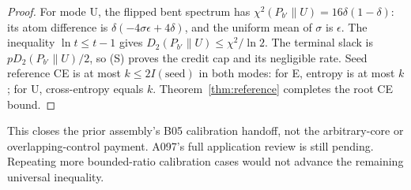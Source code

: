 \documentclass[11pt]{article}
\newcommand{\KL}{D_2}
\begin{document}
\begin{proof}
For mode U, the flipped bent spectrum has
$\chi^2(P_{b'}\|U)=16\delta(1-\delta)$:
its atom difference is $\delta(-4\sigma\epsilon+4\delta)$,
and the uniform mean of $\sigma$ is $\epsilon$.
The inequality $\ln t\le t-1$ gives
$\KL(P_{b'}\|U)\le\chi^2/\ln2$.
The terminal slack is $p\KL(P_{b'}\|U)/2$, so (S) proves
the credit cap and its negligible rate. Seed reference CE is at
most $k\le2I(\text{seed})$ in both modes: for E, entropy is at
most $k$; for U, cross-entropy equals $k$.
Theorem~\ref{thm:reference} completes the root CE bound.
\end{proof}
This closes the prior assembly's B05 calibration handoff, not the
arbitrary-core or overlapping-control payment. A097's full application
review is still pending. Repeating more bounded-ratio calibration
cases would not advance the remaining universal inequality.
\end{document}
